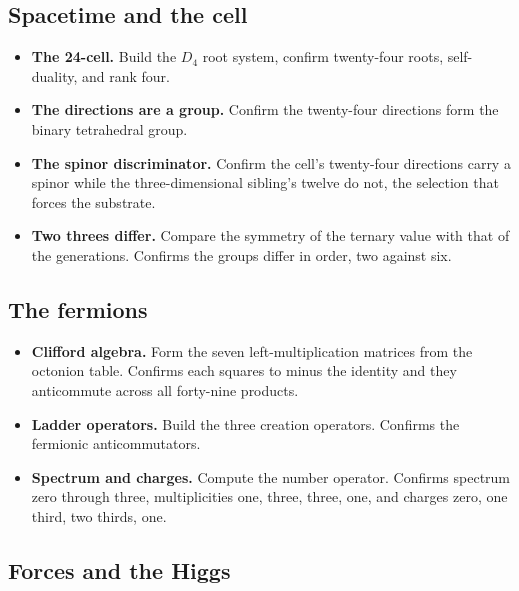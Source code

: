 \subsection*{Spacetime and the cell}

\begin{itemize}
\item \textbf{The 24-cell.} Build the $D_4$ root system, confirm twenty-four roots, self-duality, and rank four.
\item \textbf{The directions are a group.} Confirm the twenty-four directions form the binary tetrahedral group.
\item \textbf{The spinor discriminator.} Confirm the cell's twenty-four directions carry a spinor while the three-dimensional sibling's twelve do not, the selection that forces the substrate.
\item \textbf{Two threes differ.} Compare the symmetry of the ternary value with that of the generations. Confirms the groups differ in order, two against six.
\end{itemize}

\subsection*{The fermions}

\begin{itemize}
\item \textbf{Clifford algebra.} Form the seven left-multiplication matrices from the octonion table. Confirms each squares to minus the identity and they anticommute across all forty-nine products.
\item \textbf{Ladder operators.} Build the three creation operators. Confirms the fermionic anticommutators.
\item \textbf{Spectrum and charges.} Compute the number operator. Confirms spectrum zero through three, multiplicities one, three, three, one, and charges zero, one third, two thirds, one.
\end{itemize}

\subsection*{Forces and the Higgs}

